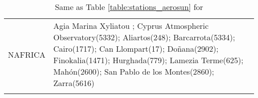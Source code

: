 \documentclass[journal abbreviation, manuscript]{copernicus}
\begin{document}
\begin{table}
\begin{tabularx}{\textwidth}{lX}
  NAFRICA &                                                                                                                                                                                                                                                                                                                                                                                                                                                                                                                                                                                                                                                                                                                                                                                                                                                                                                                                                                                                                                                                                                                                                                                                                                                                                                                                                                                                                                                                                                                                                                                                                                                                                                                                                                                                                                                                                                                                                                                                                                                                                                                                                                                                                                                                                                                                                                                                                                                                                                                                                                                                                            Agia Marina Xyliatou ; Cyprus Atmospheric Observatory(5332); Aliartos(248); Barcarrota(5334); Cairo(1717); Can Llompart(17); Doñana(2902); Finokalia(1471); Hurghada(779); Lamezia Terme(625); Mahón(2600); San Pablo de los Montes(2860); Zarra(5616) \\
\bottomhline
 \end{tabularx}
 \caption{Same as Table \ref{table:stations_aerosun} for }
 \label{table:stations_pm10}
\end{table}
\end{document}
